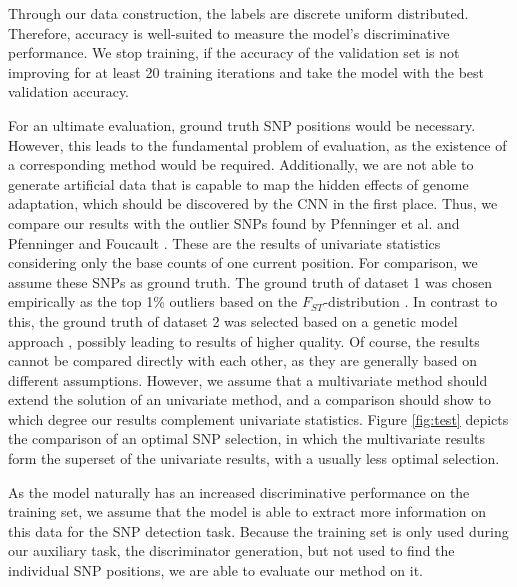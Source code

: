 \documentclass{article}
\begin{document}
Through our data construction, the labels are discrete uniform distributed. Therefore, accuracy is well-suited to measure the model's discriminative performance.
We stop training, if the accuracy of the validation set is not improving for at least 20 training iterations and take the model with the best validation accuracy.

For an ultimate evaluation, ground truth SNP positions would be necessary. However, this leads to the fundamental problem of evaluation, as the existence of a corresponding method would be required. Additionally, we are not able to generate artificial data that is capable to map the hidden effects of genome adaptation, which should be discovered by the CNN in the first place.
Thus, we compare our results with the outlier SNPs found by Pfenninger et al. \cite{pfenninger_poecilia} and Pfenninger and Foucault \cite{pfenninger_foucault}.
These are the results of univariate statistics considering only the base counts of one current position. For comparison, we assume these SNPs as ground truth. 
The ground truth of dataset 1 was chosen empirically as the top 1\% outliers based on the $F_{ST}$-distribution \cite{pfenninger_poecilia}. In contrast to this, the ground truth of dataset 2 was selected based on a genetic model approach \cite{pfenninger_foucault}, possibly leading to results of higher quality.
Of course, the results cannot be compared directly with each other, as they are generally based on different assumptions. However, we assume that a multivariate method should extend the solution of an univariate method, and a comparison should show to which degree our results complement univariate statistics. 
Figure \ref{fig:test} depicts the comparison of an optimal SNP selection, in which the multivariate results form the superset of the univariate results, with a usually less optimal selection.

As the model naturally has an increased discriminative performance on the training set, we assume that the model is able to extract more information on this data for the SNP detection task. Because the training set is only used during our auxiliary task,  the discriminator generation, but not used to find the individual SNP positions, we are able to evaluate our method on it.%
\end{document}
